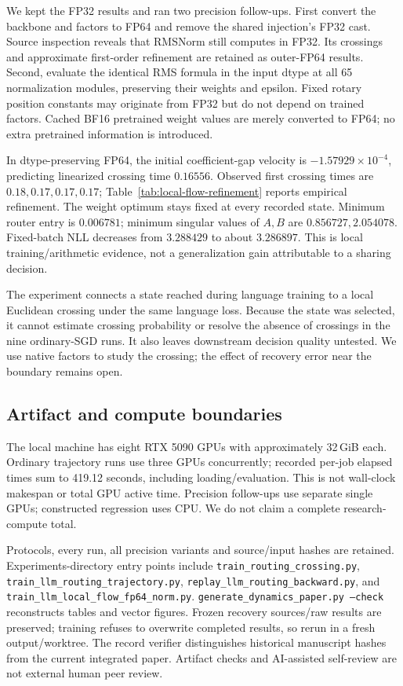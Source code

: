 We kept the FP32 results and ran two precision follow-ups. First convert the backbone
and factors to FP64 and remove the shared injection's FP32 cast. Source
inspection reveals that RMSNorm still computes in FP32. Its crossings
and approximate first-order refinement are retained as outer-FP64 results.
Second, evaluate the identical RMS formula in the input dtype at all 65
normalization modules, preserving their weights and epsilon. Fixed rotary
position constants may originate from FP32 but do not depend on trained
factors. Cached BF16 pretrained weight values are merely converted to
FP64; no extra pretrained information is introduced.



In dtype-preserving FP64, the initial coefficient-gap velocity is
$-1.57929\times10^{-4}$, predicting linearized crossing time $0.16556$.
Observed first crossing times are $0.18,0.17,0.17,0.17$;
Table~\ref{tab:local-flow-refinement} reports empirical refinement.
The weight optimum stays fixed at every recorded state. Minimum router
entry is $0.006781$; minimum singular values of $A,B$ are
$0.856727,2.054078$. Fixed-batch NLL decreases from $3.288429$ to about
$3.286897$. This is local training/arithmetic evidence, not a generalization
gain attributable to a sharing decision.

The experiment connects a state reached during language training to a
local Euclidean crossing under the same language loss. Because the state
was selected, it cannot estimate crossing probability or resolve the
absence of crossings in the nine ordinary-SGD runs. It also leaves
downstream decision quality untested. We use native factors to study
the crossing; the effect of recovery error near the boundary remains open.

\subsection{Artifact and compute boundaries}

The local machine has eight RTX 5090 GPUs with approximately 32\,GiB each.
Ordinary trajectory runs use three GPUs concurrently; recorded per-job
elapsed times sum to 419.12 seconds, including loading/evaluation.
This is not wall-clock makespan or total GPU active time. Precision
follow-ups use separate single GPUs; constructed regression uses CPU.
We do not claim a complete research-compute total.

Protocols, every run, all precision variants and source/input hashes are
retained. Experiments-directory entry points include
\texttt{train\_routing\_crossing.py},
\texttt{train\_llm\_routing\_trajectory.py},
\texttt{replay\_llm\_routing\_backward.py}, and
\texttt{train\_llm\_local\_flow\_fp64\_norm.py}.
\texttt{generate\_dynamics\_paper.py --check} reconstructs tables and
vector figures. Frozen recovery sources/raw results are preserved;
training refuses to overwrite completed results, so rerun in a fresh
output/worktree. The record verifier distinguishes historical manuscript
hashes from the current integrated paper. Artifact checks and AI-assisted
self-review are not external human peer review.
